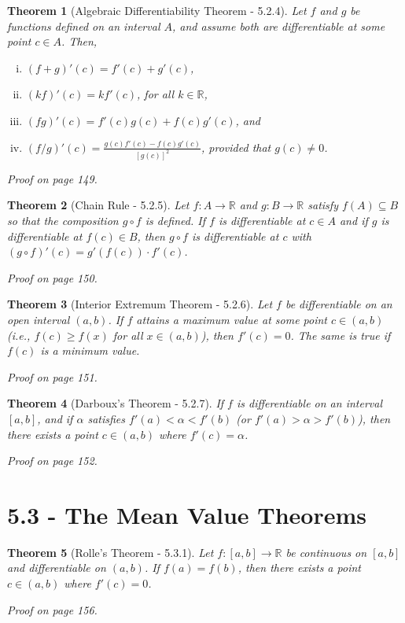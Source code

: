 \documentclass{article}
\newtheorem{theorem}{Theorem}
\begin{document}
\begin{theorem}[Algebraic Differentiability Theorem - 5.2.4]
    Let $f$ and $g$ be functions defined on an interval $A$, and assume both are differentiable at some point $c \in A$. Then,
    \begin{enumerate}[(i)]
        \item $(f+g)'(c)=f'(c)+g'(c)$,
        \item $(kf)'(c)=kf'(c)$, for all $k \in \mathbb{R}$,
        \item $(fg)'(c)=f'(c)g(c)+f(c)g'(c)$, and
        \item $(f/g)'(c)=\frac{g(c)f'(c)-f(c)g'(c)}{[g(c)]^2}$, provided that $g(c)\neq 0$.
    \end{enumerate}

    Proof on page 149.
\end{theorem}

\begin{theorem}[Chain Rule - 5.2.5]
    Let $f:A\rightarrow \mathbb{R}$ and $g:B\rightarrow \mathbb{R}$ satisfy $f(A) \subseteq B$ so that the composition $g \circ f$ is defined. If $f$ is differentiable at $c \in A$ and if $g$ is differentiable at $f(c)\in B$, then $g \circ f$ is differentiable at $c$ with $(g \circ f)'(c)=g'(f(c))\cdot f'(c)$.

    Proof on page 150.
\end{theorem}

\begin{theorem}[Interior Extremum Theorem - 5.2.6]
    Let $f$ be differentiable on an open interval $(a,b)$. If $f$ attains a maximum value at some point $c \in (a,b)$ (i.e., $f(c) \geq f(x)$ for all $x \in (a,b)$), then $f'(c) = 0$. The same is true if $f(c)$ is a minimum value.

    Proof on page 151.
\end{theorem}

\begin{theorem}[Darboux's Theorem - 5.2.7]
    If $f$ is differentiable on an interval $[a,b]$, and if $\alpha$ satisfies $f'(a) < \alpha < f'(b)$ (or $f'(a) > \alpha > f'(b)$), then there exists a point $c \in (a,b)$ where $f'(c) = \alpha$.

    Proof on page 152.
\end{theorem}

\section*{5.3 - The Mean Value Theorems}
\begin{theorem}[Rolle's Theorem - 5.3.1]
    Let $f:[a,b]\rightarrow \mathbb{R}$ be continuous on $[a,b]$ and differentiable on $(a,b)$. If $f(a) = f(b)$, then there exists a point $c \in (a,b)$ where $f'(c) = 0$.

    Proof on page 156.
\end{theorem}
\end{document}
